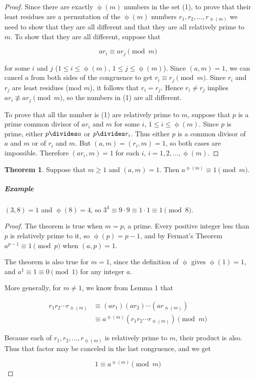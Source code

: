 \documentclass{article}
\theoremstyle{definition} %
\newtheorem{theorem}{Theorem}[section] %
\theoremstyle{definition}
\theoremstyle{definition}
\newcommand{\tot}{\upphi}
\theoremstyle{definition}
\begin{document}
  \begin{proof}
    Since there are exactly $\tot(m)$ numbers in the set (1), to prove that their least
    residues are a permutation of the $\tot(m)$ numbers $r_1, r_2, \dots, r_{\tot(m)}$
    we need to show that they are all different and that they are all relatively prime to $m$.
    To show that they are all different, suppose that
    
    \begin{equation*}
      ar_i \equiv ar_j \pmod{m}
    \end{equation*}
    
    for some $i$ and $j$ ($1 \leq i \leq \tot(m)$, $1 \leq j \leq \tot(m)$). Since $(a, m) = 1$,
    we can cancel $a$ from both sides of the congruence to get $r_i \equiv r_j \pmod{m}$.
    Since $r_i$ and $r_j$ are least residues (mod $m$), it follows that $r_i = r_j$. Hence
    $r_i \neq r_j$ implies $ar_i \nequiv ar_j \pmod{m}$, so the numbers in (1) are all different.
    
    To prove that all the number is (1) are relatively prime to $m$, suppose that $p$ is a prime
    common divisor of $ar_i$ and $m$ for some $i$, $1 \leq i \leq \tot(m)$. Since $p$ is prime,
    either $p \divides a$ or $p \divides r_i$. Thus either $p$ is a common divisor of $a$ and $m$
    or of $r_i$ and $m$. But $(a, m) = (r_i, m) = 1$, so both cases are impossible. Therefore
    $(ar_i, m) = 1$ for each $i$, $i = 1, 2, \dots, \tot(m)$.
  \end{proof}
  
  \begin{theorem}
    Suppose that $m \geq 1$ and $(a, m) = 1$. Then $a^{\tot(m)} \equiv 1 \pmod{m}$.
  \end{theorem}
  
  \subparagraph{Example} $(3, 8) = 1$ and $\tot(8) = 4$, so $3^4 \equiv 9 \cdot 9 \equiv 1 \cdot 1 \equiv 1 \pmod{8}$.
  
  \begin{proof}
    The theorem is true when $m = p$, a prime. Every positive integer less than $p$
    is relatively prime to it, so $\tot(p) = p - 1$, and by Fermat's Theorem $a^{p - 1} \equiv 1
    \pmod{p}$ when $(a, p) = 1$.
    
    The theorem is also true for $m = 1$, since the definition of $\tot$ gives $\tot(1) = 1$,
    and $a^1 \equiv 1 \equiv 0 \pmod{1}$ for any integer $a$.
    
    More generally, for $m \neq 1$, we know from Lemma 1 that
    
    \begin{align*}
      r_1r_2\cdots r_{\tot(m)} &\equiv (ar_1)(ar_2)\cdots (ar_{\tot(m)}) \\
      &\equiv a^{\tot(m)}(r_1r_2\cdots r_{\tot(m)}) \pmod{m}
    \end{align*}
    
    Because each of $r_1, r_2, \dots, r_{\tot(m)}$ is relatively prime to $m$, their product is also.
    Thus that factor may be canceled in the last congruence, and we get
    
    \[ 1 \equiv a^{\tot(m)} \pmod{m} \]
  \end{proof}
  
\end{document}
